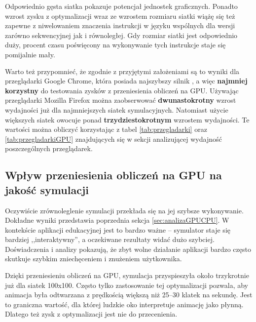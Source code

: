 Odpowiednio gęsta siatka pokazuje potencjał jednostek graficznych. Ponadto
wzrost zysku z optymalizacji wraz ze wzrostem rozmiaru siatki wiążę się też
zapewne z niwelowaniem znaczenia instrukcji w języku  wspólnych
dla wersji zarówno sekwencyjnej jak i równoległej. Gdy rozmiar siatki jest
odpowiednio duży, procent czasu poświęcony na wykonywanie tych instrukcje staje
się pomijalnie mały.

Warto też przypomnieć, że zgodnie z przyjętymi założeniami są to wyniki dla
przeglądarki Google Chrome, która posiada najszybszy silnik \js, a więc
\textbf{najmniej korzystny} do testowania zysków z przeniesienia obliczeń na
GPU. Używając przeglądarki Mozilla Firefox można zaobserwować
\textbf{dwunastokrotny} wzrost wydajności już dla najmniejszych siatek
symulacyjnych. Natomiast użycie większych siatek owocuje ponad
\textbf{trzydziestokrotnym} wzrostem wydajności. Te wartości można obliczyć
korzystając z tabel \ref{tab:przegladarki} oraz \ref{tab:przegladarkiGPU}
znajdujących się w sekcji analizującej wydajność poszczególnych przeglądarek.

\subsection{Wpływ przeniesienia obliczeń na GPU na jakość symulacji}

Oczywiście zrównoleglenie symulacji przekłada się na jej szybsze wykonywanie.
Dokładne wyniki przedstawia poprzednia sekcja \ref{sec:analizaGPUCPU}. W
kontekście aplikacji edukacyjnej jest to bardzo ważne -- symulator staje się
bardziej ,,interaktywny'', a oczekiwane rezultaty widać dużo szybciej.
Doświadczenia i analizy pokazują, że zbyt wolne działanie aplikacji bardzo
często skutkuje szybkim zniechęceniem i znużeniem użytkownika.

Dzięki przeniesieniu obliczeń na GPU, symulacja przyspieszyła około trzykrotnie
już dla siatek 100x100. Często tylko zastosowanie tej optymalizacji pozwala, aby
animacja była odtwarzana z prędkością większą niż 25--30 klatek na sekundę. Jest
to graniczna wartość, dla której ludzkie oko interpretuje animację jako płynną.
Dlatego też zysk z optymalizacji jest nie do przecenienia.

